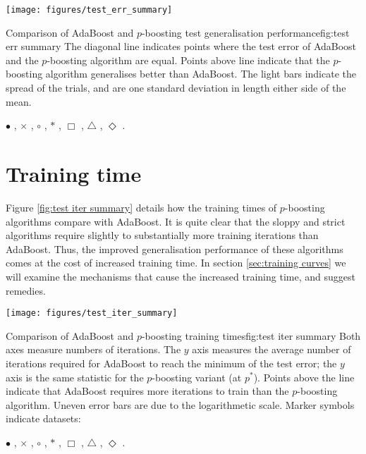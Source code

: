 \begin{linefigure}
\begin{center}
\texttt{[image: figures/test\_err\_summary]}
\end{center}
\begin{capt}{Comparison of AdaBoost and $p$-boosting test generalisation
performance}{fig:test err summary}
The diagonal line indicates points where the test error of AdaBoost
and the $p$-boosting algorithm are equal.  Points above line indicate
that the $p$-boosting algorithm generalises better than AdaBoost.  The
light bars indicate the spread of the trials, and are one standard
deviation in length either side of the mean.

 $\bullet$ , $\times$ , $\circ$
, $\ast$ , $\Box$ , $\bigtriangleup$
, $\Diamond$ .
\end{capt}
\end{linefigure}


\section{Training time}

Figure \ref{fig:test iter summary} details how the training times of
$p$-boosting algorithms compare with AdaBoost.  It is quite clear that
the sloppy and strict algorithms require slightly to substantially
more training iterations than AdaBoost.  Thus, the improved
generalisation performance of these algorithms comes at the cost of
increased training time.  In section \ref{sec:training curves} we will
examine the mechanisms that cause the increased training time, and
suggest remedies.

\begin{linefigure}
\begin{center}
\texttt{[image: figures/test\_iter\_summary]}
\end{center}
\begin{capt}{Comparison of AdaBoost and $p$-boosting training
times}{fig:test iter summary} 
Both axes measure numbers of iterations.  The $y$ axis measures the
average number of iterations required for AdaBoost to reach the
minimum of the test error; the $y$ axis is the same statistic for the
$p$-boosting variant (at $p^{\ast}$).  Points above the line indicate
that AdaBoost requires more iterations to train than the $p$-boosting
algorithm.  Uneven error bars are due to the logarithmetic scale.
Marker symbols indicate datasets: 

 $\bullet$ , $\times$ , $\circ$
, $\ast$ , $\Box$ , $\bigtriangleup$
, $\Diamond$ .
\end{capt}
\end{linefigure}


